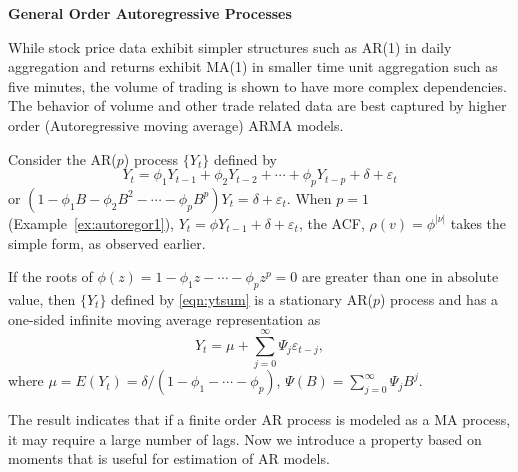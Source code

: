 \noindent\textbf{General Order Autoregressive Processes} \twomedskip


While stock price data exhibit simpler structures such as AR(1) in daily aggregation and returns exhibit MA(1) in smaller time unit aggregation such as five minutes, the volume of trading is shown to have more complex dependencies. The behavior of volume and other trade related data are best captured by higher order (Autoregressive moving average) ARMA models. 


Consider the AR($p$) process $\{ Y_t \}$ defined by
	\begin{equation} \label{eqn:ytsum}
	Y_t = \phi_1 Y_{t-1} + \phi_2 Y_{t-2} + \cdots + \phi_p Y_{t-p} + \delta + \varepsilon_t
	\end{equation}
or $(1 - \phi_1 B - \phi_2 B^2 - \cdots - \phi_p B^p) Y_t = \delta + \varepsilon_t$. When $p= 1$ (Example~\ref{ex:autoregor1}), $Y_t = \phi Y_{t-1} + \delta + \varepsilon_t$, the ACF, $\rho(v)= \phi^{\lvert \nu \rvert}$ takes the simple form, as observed earlier.


\begin{result}
If the roots of $\phi(z) = 1- \phi_1 z - \cdots - \phi_p z^p = 0$ are greater than one in absolute value, then $\{ Y_t \}$ defined by \eqref{eqn:ytsum} is a stationary AR($p$) process and has a one-sided infinite moving average representation as
	\begin{equation} \label{eqn:ytthm}
	Y_t= \mu + \sum_{j=0}^\infty \Psi_j\varepsilon_{t-j},
	\end{equation}
where $\mu = E(Y_t) = \delta / (1 - \phi_1 - \cdots - \phi_p)$, $\Psi(B) = \sum_{j=0}^\infty \Psi_j B^j$. 
\end{result}


The result indicates that if a finite order AR process is modeled as a MA process, it may require a large number of lags. Now we introduce a property based on moments that is useful for estimation of AR models.


